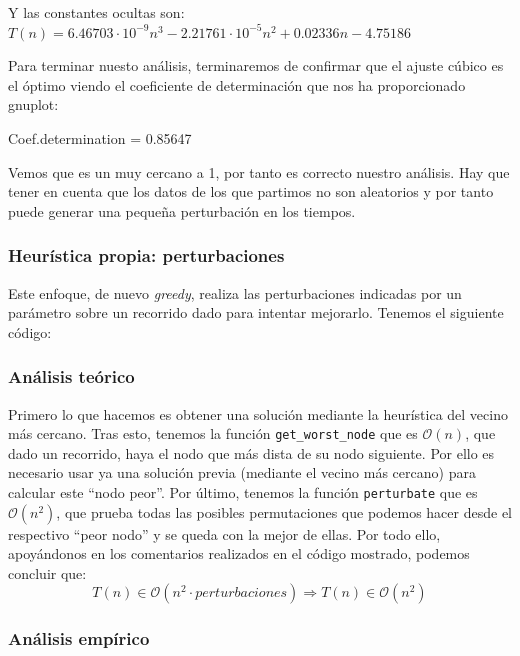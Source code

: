 \documentclass[10pt,a4paper]{article}
\begin{document}
 \newpage
 
 Y las constantes ocultas son:
 \(T(n) = 6.46703 \cdot 10^{-9} n^3 - 2.21761 \cdot 10^{-5} n^2 + 0.02336 n - 4.75186 \)
 
 Para terminar nuesto análisis, terminaremos de confirmar que el ajuste cúbico es el óptimo viendo el coeficiente de determinación que nos ha proporcionado gnuplot:
 
 Coef.determination = 0.85647
 
 Vemos que es un muy cercano a 1, por tanto es correcto nuestro análisis. Hay que tener en cuenta que los datos de los que partimos no son aleatorios y por tanto puede generar una pequeña perturbación en los tiempos.

\subsubsection{Heurística propia: perturbaciones}

Este enfoque, de nuevo \textit{greedy}, realiza las perturbaciones indicadas por un parámetro sobre un recorrido dado para intentar mejorarlo. Tenemos el siguiente código:


\subsubsection*{Análisis teórico}

Primero lo que hacemos es obtener una solución mediante la heurística del vecino más cercano. Tras esto, tenemos la función \texttt{get\_worst\_node} que es \(\mathcal{O}(n)\), que dado un recorrido, haya el nodo que más dista de su nodo siguiente. Por ello es necesario usar ya una solución previa (mediante el vecino más cercano) para calcular este ``nodo peor''. Por último, tenemos la función \texttt{perturbate} que es \(\mathcal{O}(n^2)\), que prueba todas las posibles permutaciones que podemos hacer desde el respectivo ``peor nodo'' y se queda con la mejor de ellas. Por todo ello, apoyándonos en los comentarios realizados en el código mostrado, podemos concluir que:
\[
	T(n) \in \mathcal{O}(n^2 \cdot perturbaciones) \Rightarrow T(n) \in \mathcal{O}(n^2)
\]

\subsubsection*{Análisis empírico}
\end{document}
